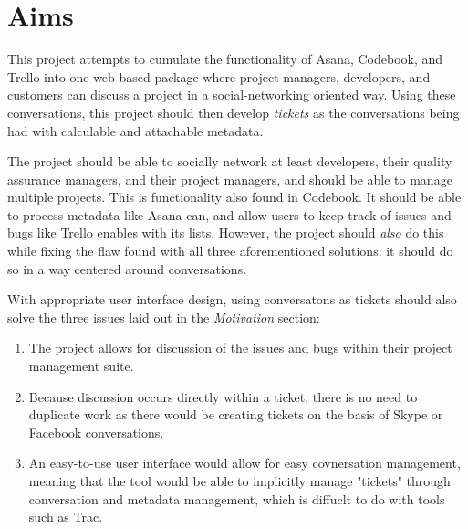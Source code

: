 \documentclass[10pt]{article}
\begin{document}
\section{Aims}\par
This project attempts to cumulate the functionality of Asana, Codebook, and Trello into one web-based package where project managers, developers, and customers can discuss a project in a social-networking oriented way. Using these conversations, this project should then develop \emph{tickets} as the conversations being had with calculable and attachable metadata. \par
The project should be able to socially network at least developers, their quality assurance managers, and their project managers, and should be able to manage multiple projects. This is functionality also found in Codebook. It should be able to process metadata like Asana can, and allow users to keep track of issues and bugs like Trello enables with its lists. However, the project should \emph{also} do this while fixing the flaw found with all three aforementioned solutions: it should do so in a way centered around conversations. \par
With appropriate user interface design, using conversatons as tickets should also solve the three issues laid out in the \emph{Motivation} section:
\begin{enumerate}
\item The project allows for discussion of the issues and bugs within their project management suite.
\item Because discussion occurs directly within a ticket, there is no need to duplicate work as there would be creating tickets on the basis of Skype or Facebook conversations.
\item An easy-to-use user interface would allow for easy covnersation management, meaning that the tool would be able to implicitly manage "tickets" through conversation and metadata management, which is diffuclt to do with tools such as Trac. %
\end{enumerate}
\end{document}
